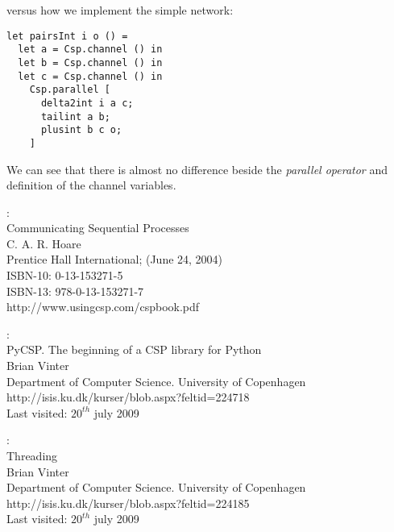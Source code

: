 \documentclass[a4paper,12pt]{article}
\begin{document}
versus how we implement the simple network:

\begin{verbatim}
let pairsInt i o () =
  let a = Csp.channel () in
  let b = Csp.channel () in
  let c = Csp.channel () in
    Csp.parallel [
      delta2int i a c;
      tailint a b;
      plusint b c o;
    ]
\end{verbatim}

We can see that there is almost no difference beside the {\it parallel operator}
and definition of the channel variables.

\begin{thebibliography}{99}

:\\
Communicating Sequential Processes\\
C. A. R. Hoare\\
Prentice Hall International; (June 24, 2004)\\
ISBN-10: 0-13-153271-5\\
ISBN-13: 978-0-13-153271-7\\
http://www.usingcsp.com/cspbook.pdf


:\\
PyCSP. The beginning of a CSP library for Python\\
Brian Vinter\\
Department of Computer Science. University of Copenhagen\\
http://isis.ku.dk/kurser/blob.aspx?feltid=224718\\
Last visited: $20^{th}$ july 2009

:\\
Threading\\
Brian Vinter\\
Department of Computer Science. University of Copenhagen\\
http://isis.ku.dk/kurser/blob.aspx?feltid=224185\\
Last visited: $20^{th}$ july 2009



\end{thebibliography}


\appendix
\newpage
\end{document}
